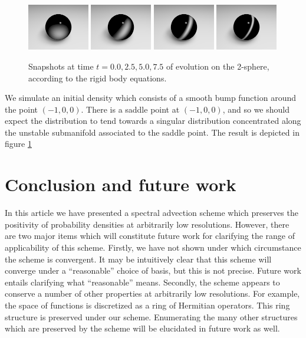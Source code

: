 \documentclass[a4paper, 12 pt]{amsart}
\begin{document}
\begin{figure}[h]
  \centering
  \includegraphics[width=0.24\textwidth]{./images/sphere_t0}
  \includegraphics[width=0.24\textwidth]{./images/sphere_t2p5}
  \includegraphics[width=0.24\textwidth]{./images/sphere_t5}
  \includegraphics[width=0.24\textwidth]{./images/sphere_t7p5}
  \caption{Snapshots at time $t=0.0,2.5,5.0,7.5$ of evolution on the 2-sphere, according to the rigid body equations.}
  \label{fig:sphere}
\end{figure}

We simulate an initial density which consists of 
a smooth bump function around the point $(-1,0,0)$.
There is a saddle point at $(-1,0,0)$, and so 
we should expect the distribution to tend towards
a singular distribution concentrated along the unstable
submanifold associated to the saddle point.
The result is depicted in figure \ref{fig:sphere}



\section{Conclusion and future work}
In this article we have presented a spectral advection scheme which preserves the positivity of probability densities at arbitrarily low resolutions.
However, there are two major items which will constitute future work
for clarifying the range of applicability of this scheme.
Firstly, we have not shown under which circumstance the scheme is
 convergent.
It may be intuitively clear that this scheme will converge
under a ``reasonable'' choice of basis, but this is not precise.
Future work entails clarifying what ``reasonable'' means.
Secondly, the scheme appears to conserve a number of other
properties at arbitrarily low resolutions.
For example, the space of functions is discretized as
a ring of Hermitian operators.
This ring structure is preserved under our scheme.
Enumerating the many other structures which are preserved 
by the scheme will be elucidated in future work as well.
\end{document}
